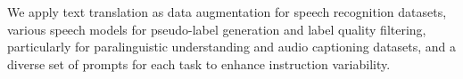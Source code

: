 \documentclass{article}
\begin{document}
We apply text translation as data augmentation for speech recognition datasets, various speech models for pseudo-label generation and label quality filtering, particularly for paralinguistic understanding and audio captioning datasets, and a diverse set of prompts for each task to enhance instruction variability.
\end{document}
